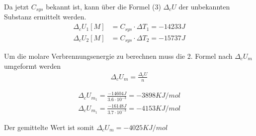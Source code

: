 Da jetzt $C_{sys}$ bekannt ist, kann über die Formel (3) $\Delta _c U$ der unbekannten Substanz ermittelt werden.\\


\begin{align*}
	\Delta_c U_1[M] & = C_{sys} \cdot \Delta T_1 = -14233 J \\
	\Delta_c U_2[M] & = C_{sys} \cdot \Delta T_2 = -15737 J
\end{align*}

Um die molare Verbrennungsenergie zu berechnen muss die 2. Formel nach $\Delta_c U_m$ umgeformt werden
\begin{align*}
	\Delta_c U_m  = \frac{\Delta_c U}{n}
\end{align*}

\begin{align*}
	\Delta_c U_m_1  = \frac{-14604 J}{3.6 \cdot 10^{-3}} = -3898 KJ/mol \\
	\Delta_c U_m_1  = \frac{-16148 J}{3.7 \cdot 10^{-3}} = -4153 KJ/mol
\end{align*}

Der gemittelte Wert ist somit $\Delta_c U_m = -4025 KJ/mol$

\newpage

